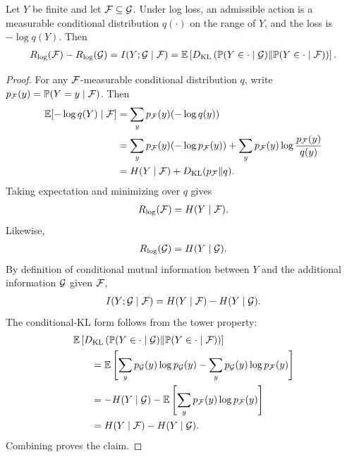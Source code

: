 \begin{theorem}
\label{thm:log-value:formal}
Let $Y$ be finite and let $\mathcal{F}\subseteq\mathcal{G}$. Under log loss, an admissible action is a measurable conditional distribution $q(\cdot)$ on the range of $Y$, and the loss is $-\log q(Y)$. Then
\begin{align*}
R_{\log}(\mathcal{F})-R_{\log}(\mathcal{G})
=
I(Y;\mathcal{G}\mid\mathcal{F})
=
\operatorname*{\mathbb{E}}\left[
D_{\mathrm{KL}}\left(
\mathbb P(Y\in\cdot\mid\mathcal{G})
\middle\|
\mathbb P(Y\in\cdot\mid\mathcal{F})
\right)
\right].
\end{align*}
\end{theorem}
\begin{proof}
For any $\mathcal{F}$-measurable conditional distribution $q$, write $p_{\mathcal{F}}(y)=\mathbb P(Y=y\mid\mathcal{F})$. Then
\begin{align*}
\operatorname*{\mathbb{E}}[-\log q(Y)\mid\mathcal{F}]&=\sum_y p_{\mathcal{F}}(y)(-\log q(y))\\
&=\sum_y p_{\mathcal{F}}(y)(-\log p_{\mathcal{F}}(y))+\sum_y p_{\mathcal{F}}(y)\log\frac{p_{\mathcal{F}}(y)}{q(y)}\\
&=H(Y\mid\mathcal{F})+D_{\mathrm{KL}}(p_{\mathcal{F}}\|q).
\end{align*}
Taking expectation and minimizing over $q$ gives
\begin{align*}
R_{\log}(\mathcal{F})=H(Y\mid\mathcal{F}).
\end{align*}
Likewise,
\begin{align*}
R_{\log}(\mathcal{G})=H(Y\mid\mathcal{G}).
\end{align*}
By definition of conditional mutual information between $Y$ and the additional information $\mathcal{G}$ given $\mathcal{F}$,
\begin{align*}
I(Y;\mathcal{G}\mid\mathcal{F})=H(Y\mid\mathcal{F})-H(Y\mid\mathcal{G}).
\end{align*}
The conditional-KL form follows from the tower property:
\begin{align*}
&\operatorname*{\mathbb{E}}\left[
D_{\mathrm{KL}}\left(
\mathbb P(Y\in\cdot\mid\mathcal{G})
\middle\|
\mathbb P(Y\in\cdot\mid\mathcal{F})
\right)
\right]\\
&\qquad=
\operatorname*{\mathbb{E}}\left[
\sum_y p_{\mathcal{G}}(y)\log p_{\mathcal{G}}(y)
-
\sum_y p_{\mathcal{G}}(y)\log p_{\mathcal{F}}(y)
\right]\\
&\qquad=
-H(Y\mid\mathcal{G})
-
\operatorname*{\mathbb{E}}\left[
\sum_y p_{\mathcal{F}}(y)\log p_{\mathcal{F}}(y)
\right]\\
&\qquad=
H(Y\mid\mathcal{F})-H(Y\mid\mathcal{G}).
\end{align*}
Combining proves the claim.
\end{proof}

